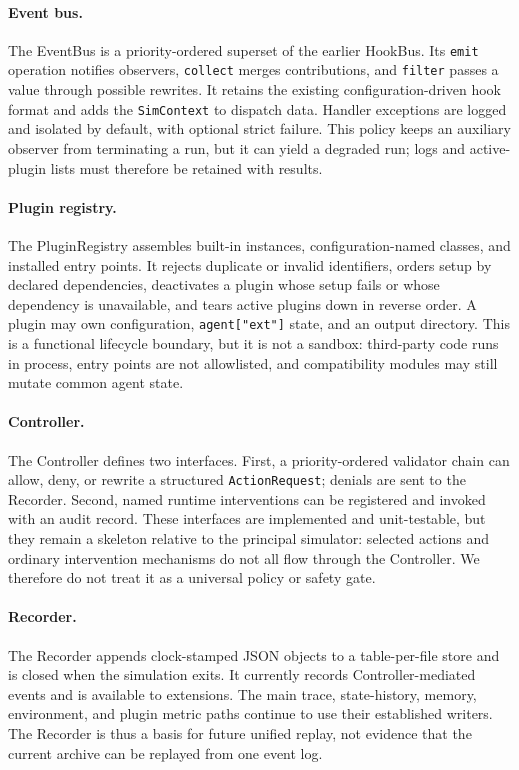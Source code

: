 \paragraph{Event bus.}
The EventBus is a priority-ordered superset of the earlier HookBus.  Its
\texttt{emit} operation notifies observers, \texttt{collect} merges
contributions, and \texttt{filter} passes a value through possible rewrites.
It retains the existing configuration-driven hook format and adds the
\texttt{SimContext} to dispatch data.  Handler exceptions are logged and
isolated by default, with optional strict failure.  This policy keeps an
auxiliary observer from terminating a run, but it can yield a degraded run;
logs and active-plugin lists must therefore be retained with results.

\paragraph{Plugin registry.}
The PluginRegistry assembles built-in instances, configuration-named classes,
and installed entry points.  It rejects duplicate or invalid identifiers,
orders setup by declared dependencies, deactivates a plugin whose setup fails
or whose dependency is unavailable, and tears active plugins down in reverse
order.  A plugin may own configuration, \texttt{agent["ext"]} state, and an
output directory.  This is a functional lifecycle boundary, but it is not a
sandbox: third-party code runs in process, entry points are not allowlisted,
and compatibility modules may still mutate common agent state.

\paragraph{Controller.}
The Controller defines two interfaces.  First, a priority-ordered validator
chain can allow, deny, or rewrite a structured \texttt{ActionRequest}; denials
are sent to the Recorder.  Second, named runtime interventions can be
registered and invoked with an audit record.  These interfaces are implemented
and unit-testable, but they remain a skeleton relative to the principal
simulator: selected actions and ordinary intervention mechanisms do not all
flow through the Controller.  We therefore do not treat it as a universal
policy or safety gate.

\paragraph{Recorder.}
The Recorder appends clock-stamped JSON objects to a table-per-file store and
is closed when the simulation exits.  It currently records Controller-mediated
events and is available to extensions.  The main trace, state-history, memory,
environment, and plugin metric paths continue to use their established writers.
The Recorder is thus a basis for future unified replay, not evidence that the
current archive can be replayed from one event log.


